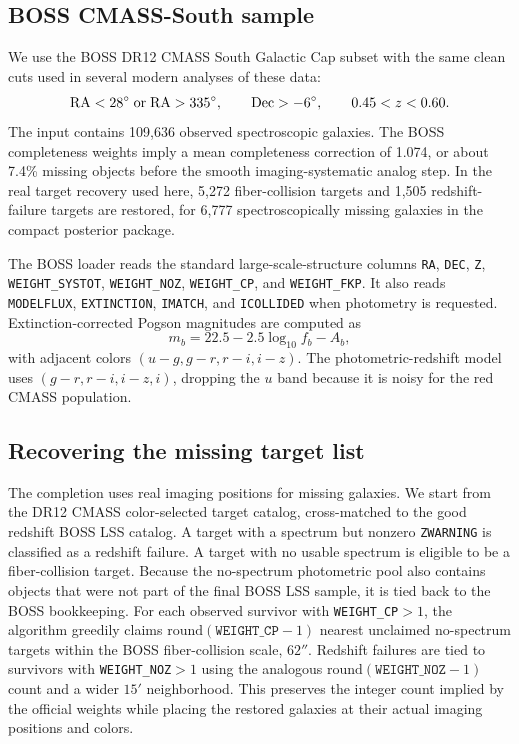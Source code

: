 \documentclass[apj]{emulateapj}
\begin{document}
\subsection{BOSS CMASS-South sample}
\label{subsec:bossdata}

We use the BOSS DR12 CMASS South Galactic Cap subset with the same clean cuts
used in several modern analyses of these data:
\begin{equation}
  {\rm RA}<28^\circ \; {\rm or} \; {\rm RA}>335^\circ,\qquad
  {\rm Dec}>-6^\circ,\qquad
  0.45<z<0.60 .
\end{equation}
The input contains 109,636 observed spectroscopic galaxies.  The BOSS
completeness weights imply a mean completeness correction of 1.074, or about
7.4\% missing objects before the smooth imaging-systematic analog step.  In the
real target recovery used here, 5,272 fiber-collision targets and 1,505
redshift-failure targets are restored, for 6,777 spectroscopically missing
galaxies in the compact posterior package.

The BOSS loader reads the standard large-scale-structure columns
\texttt{RA}, \texttt{DEC}, \texttt{Z}, \texttt{WEIGHT\_SYSTOT},
\texttt{WEIGHT\_NOZ}, \texttt{WEIGHT\_CP}, and \texttt{WEIGHT\_FKP}.  It also
reads \texttt{MODELFLUX}, \texttt{EXTINCTION}, \texttt{IMATCH}, and
\texttt{ICOLLIDED} when photometry is requested.  Extinction-corrected
Pogson magnitudes are computed as
\begin{equation}
  m_b = 22.5 - 2.5\log_{10} f_b - A_b,
\end{equation}
with adjacent colors $(u-g,g-r,r-i,i-z)$.  The photometric-redshift model uses
$(g-r,r-i,i-z,i)$, dropping the $u$ band because it is noisy for the red CMASS
population.

\subsection{Recovering the missing target list}
\label{subsec:targets}

The completion uses real imaging positions for missing galaxies.  We start
from the DR12 CMASS color-selected target catalog, cross-matched to the good
redshift BOSS LSS catalog.  A target with a spectrum but nonzero
\texttt{ZWARNING} is classified as a redshift failure.  A target with no usable
spectrum is eligible to be a fiber-collision target.  Because the no-spectrum
photometric pool also contains objects that were not part of the final BOSS LSS
sample, it is tied back to the BOSS bookkeeping.  For each observed survivor
with \texttt{WEIGHT\_CP}$>1$, the algorithm greedily claims
$\mathrm{round}(\texttt{WEIGHT\_CP}-1)$ nearest unclaimed no-spectrum targets
within the BOSS fiber-collision scale, $62''$.  Redshift failures are tied to
survivors with \texttt{WEIGHT\_NOZ}$>1$ using the analogous
$\mathrm{round}(\texttt{WEIGHT\_NOZ}-1)$ count and a wider $15'$ neighborhood.
This preserves the integer count implied by the official weights while
placing the restored galaxies at their actual imaging positions and colors.
\end{document}
